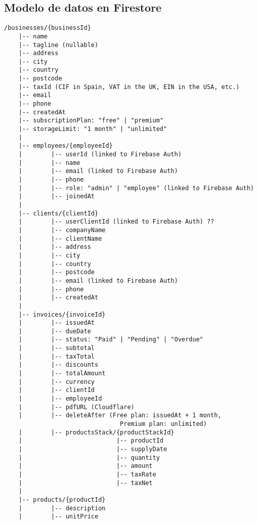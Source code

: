 \subsection{Modelo de datos en Firestore}

\begin{large}

\begin{lstlisting}[language={},basicstyle=\ttfamily\small]
/businesses/{businessId}
    |-- name
    |-- tagline (nullable)
    |-- address
    |-- city
    |-- country
    |-- postcode
    |-- taxId (CIF in Spain, VAT in the UK, EIN in the USA, etc.)
    |-- email
    |-- phone
    |-- createdAt
    |-- subscriptionPlan: "free" | "premium"
    |-- storageLimit: "1 month" | "unlimited"
    |
    |-- employees/{employeeId}
    |        |-- userId (linked to Firebase Auth)
    |        |-- name
    |        |-- email (linked to Firebase Auth)
    |        |-- phone
    |        |-- role: "admin" | "employee" (linked to Firebase Auth)
    |        |-- joinedAt
    |
    |-- clients/{clientId}
    |        |-- userClientId (linked to Firebase Auth) ??
    |        |-- companyName
    |        |-- clientName
    |        |-- address
    |        |-- city
    |        |-- country
    |        |-- postcode
    |        |-- email (linked to Firebase Auth)
    |        |-- phone
    |        |-- createdAt
    |
    |-- invoices/{invoiceId}
    |        |-- issuedAt
    |        |-- dueDate
    |        |-- status: "Paid" | "Pending" | "Overdue"
    |        |-- subtotal
    |        |-- taxTotal
    |        |-- discounts
    |        |-- totalAmount
    |        |-- currency
    |        |-- clientId
    |        |-- employeeId
    |        |-- pdfURL (Cloudflare)
    |        |-- deleteAfter (Free plan: issuedAt + 1 month,
                                Premium plan: unlimited)
    |        |-- productsStack/{productStackId}
    |                          |-- productId
    |                          |-- supplyDate
    |                          |-- quantity
    |                          |-- amount
    |                          |-- taxRate
    |                          |-- taxNet
    |
    |-- products/{productId}
    |        |-- description
    |        |-- unitPrice
\end{lstlisting}


\end{large}
